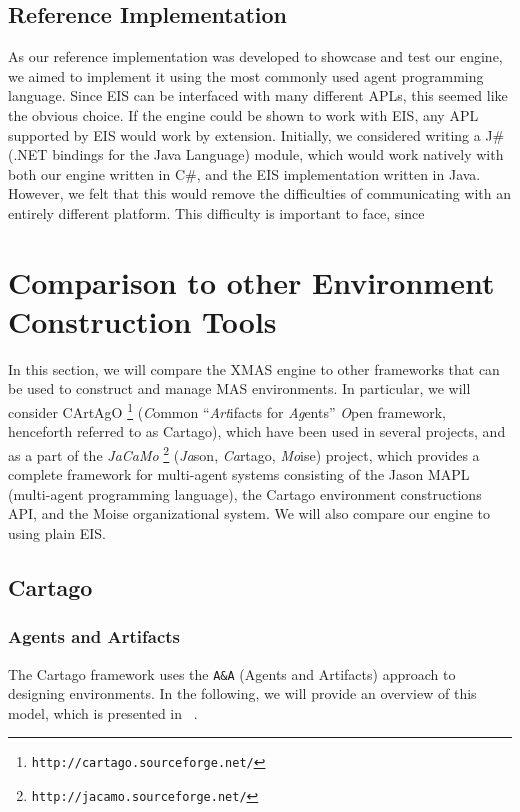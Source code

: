 \subsection*{Reference Implementation}

As our reference implementation was developed to showcase and test
our engine, we aimed to implement it using the most commonly used
agent programming language. Since EIS can be interfaced with many
different APLs, this seemed like the obvious choice. If the engine
could be shown to work with EIS, any APL supported by EIS would work
by extension. Initially, we considered writing a J\# (.NET bindings
for the Java Language) module, which would work natively with both
our engine written in C\#, and the EIS implementation written in Java.
However, we felt that this would remove the difficulties of communicating
with an entirely different platform. This difficulty is important
to face, since 


\section{Comparison to other Environment Construction Tools\label{sec:DiscussionComparison}}

In this section, we will compare the XMAS engine to other frameworks
that can be used to construct and manage MAS environments. In particular,
we will consider CArtAgO%
\footnote{\texttt{http://cartago.sourceforge.net/}%
} (\emph{C}ommon ``\emph{Art}ifacts for \emph{Ag}ents'' \emph{O}pen
framework, henceforth referred to as Cartago), which have been used
in several projects, and as a part of the \emph{JaCaMo}%
\footnote{\texttt{http://jacamo.sourceforge.net/}%
} (\emph{Ja}son, \emph{Ca}rtago, \emph{Mo}ise) project, which provides
a complete framework for multi-agent systems consisting of the Jason
MAPL (multi-agent programming language), the Cartago environment constructions
API, and the Moise organizational system. We will also compare our
engine to using plain EIS.


\subsection{Cartago}


\subsubsection*{Agents and Artifacts}

The Cartago framework uses the \texttt{A\&A} (Agents and Artifacts)
approach to designing environments. In the following, we will provide
an overview of this model, which is presented in ~\cite{Ricci08}.

